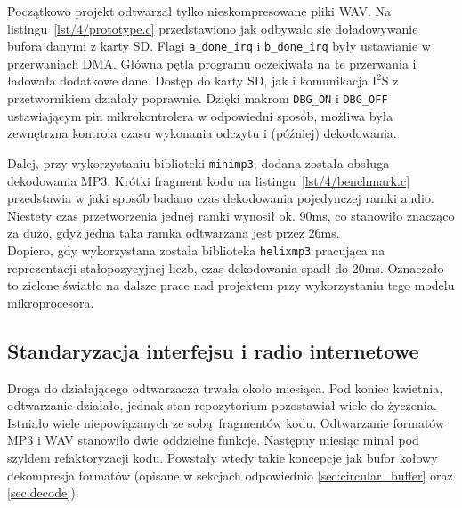 \documentclass[polish]{aghengthesis}
\newcommand{\isqs}{$\text{I}^{2}\text{S}$}
\newcommand{\lstfile}[3]{
	\noindent
	\hspace{0.1\linewidth}
	\begin{minipage}{0.8\linewidth}
		
	\end{minipage}
	\vspace{0.3cm}
}
\begin{document}
			\lstfile{c}{Realizacja podstawowego ładowania bufora}{lst/4/prototype.c}
			
			Początkowo projekt odtwarzał tylko nieskompresowane pliki WAV. Na listingu~\ref{lst/4/prototype.c} przedstawiono jak odbywało się doładowywanie bufora danymi z karty SD. Flagi \lstinline|a_done_irq| i \lstinline|b_done_irq| były ustawianie w przerwaniach DMA. Główna pętla programu oczekiwała na te przerwania i ładowała dodatkowe dane. Dostęp do karty SD, jak i komunikacja \isqs{} z przetwornikiem działały poprawnie. Dzięki makrom \lstinline|DBG_ON| i \lstinline|DBG_OFF| ustawiającym pin mikrokontrolera w odpowiedni sposób, możliwa była zewnętrzna kontrola czasu wykonania odczytu i (później) dekodowania.
			
			\lstfile{c}{Pomiar czasu dekodowania ramki MP3}{lst/4/benchmark.c}
			
			Dalej, przy wykorzystaniu biblioteki \lstinline|minimp3|\textsuperscript{\cite{minimp3}}, dodana została obsługa dekodowania MP3. Krótki fragment kodu na listingu~\ref{lst/4/benchmark.c} przedstawia w jaki sposób badano czas dekodowania pojedynczej ramki audio. Niestety czas przetworzenia jednej ramki wynosił ok. 90ms, co stanowiło znacząco za dużo, gdyż jedna taka ramka odtwarzana jest przez 26ms.
			$ $\\
			
			Dopiero, gdy wykorzystana została biblioteka \lstinline|helixmp3| pracująca na reprezentacji stałopozycyjnej liczb, czas dekodowania spadł do 20ms. Oznaczało to zielone światło na dalsze prace nad projektem przy wykorzystaniu tego modelu mikroprocesora.
			
		\subsection{Standaryzacja interfejsu i radio internetowe}
			Droga do działającego odtwarzacza trwała około miesiąca. Pod koniec kwietnia, odtwarzanie działało, jednak stan repozytorium pozostawiał wiele do życzenia. Istniało wiele niepowiązanych ze sobą fragmentów kodu. Odtwarzanie formatów MP3 i WAV stanowiło dwie oddzielne funkcje. Następny miesiąc minał pod szyldem refaktoryzacji kodu. Powstały wtedy takie koncepcje jak bufor kołowy dekompresja formatów (opisane w sekcjach odpowiednio \ref{sec:circular_buffer} oraz \ref{sec:decode}).
			$ $\\
			
\end{document}
